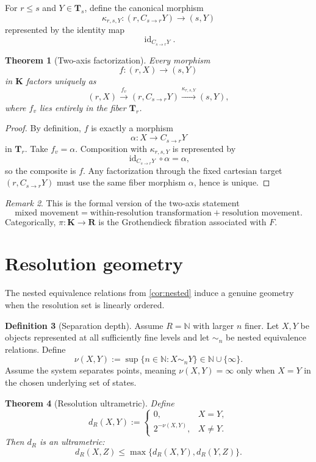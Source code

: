 \documentclass[11pt]{article}
\newtheorem{theorem}{Theorem}[section]
\theoremstyle{definition}
\newtheorem{definition}[theorem]{Definition}
\theoremstyle{remark}
\newtheorem{remark}[theorem]{Remark}
\newcommand{\K}{\mathbf K}
\newcommand{\Rcat}{\mathbf R}
\newcommand{\Tcat}{\mathbf T}
\newcommand{\id}{\operatorname{id}}
\begin{document}
For $r\le s$ and $Y\in\Tcat_s$, define the canonical morphism
\[
\kappa_{r,s,Y}:
(r,C_{s\to r}Y)\longrightarrow(s,Y)
\]
represented by the identity map
\[
\id_{C_{s\to r}Y}.
\]

\begin{theorem}[Two-axis factorization]\label{thm:factorization}
Every morphism
\[
f:(r,X)\longrightarrow(s,Y)
\]
in $\K$ factors uniquely as
\[
(r,X)
\xrightarrow{f_v}
(r,C_{s\to r}Y)
\xrightarrow{\kappa_{r,s,Y}}
(s,Y),
\]
where $f_v$ lies entirely in the fiber $\Tcat_r$.
\end{theorem}

\begin{proof}
By definition, $f$ is exactly a morphism
\[
\alpha:X\to C_{s\to r}Y
\]
in $\Tcat_r$. Take $f_v=\alpha$. Composition with $\kappa_{r,s,Y}$ is represented by
\[
\id_{C_{s\to r}Y}\circ\alpha=\alpha,
\]
so the composite is $f$. Any factorization through the fixed cartesian target $(r,C_{s\to r}Y)$ must use the same fiber morphism $\alpha$, hence is unique.
\end{proof}

\begin{remark}
This is the formal version of the two-axis statement
\[
\boxed{
\text{mixed movement}
=
\text{within-resolution transformation}
+
\text{resolution movement}.
}
\]
Categorically, $\pi:\K\to\Rcat$ is the Grothendieck fibration associated with $F$.
\end{remark}

\section{Resolution geometry}

The nested equivalence relations from \cref{cor:nested} induce a genuine geometry when the resolution set is linearly ordered.

\begin{definition}[Separation depth]
Assume $R=\mathbb N$ with larger $n$ finer. Let $X,Y$ be objects represented at all sufficiently fine levels and let $\sim_n$ be nested equivalence relations. Define
\[
\nu(X,Y):=\sup\{n\in\mathbb N:X\sim_nY\}\in\mathbb N\cup\{\infty\}.
\]
Assume the system separates points, meaning $\nu(X,Y)=\infty$ only when $X=Y$ in the chosen underlying set of states.
\end{definition}

\begin{theorem}[Resolution ultrametric]\label{thm:ultrametric}
Define
\[
d_R(X,Y):=
\begin{cases}
0,&X=Y,\\
2^{-\nu(X,Y)},&X\ne Y.
\end{cases}
\]
Then $d_R$ is an ultrametric:
\[
d_R(X,Z)\le\max\{d_R(X,Y),d_R(Y,Z)\}.
\]
\end{theorem}
\end{document}
